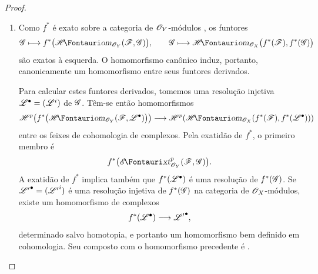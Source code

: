 \begin{proof}
\begin{enumerate}
  \item[\rm(i)]
  Como $f^*$ é exato sobre a categoria de $\mathscr{O}_Y$-módulos
  , os funtores
  \[
    \sh{G}\longmapsto
      f^*\bigl(\shHom_{\sh{O}_Y}(\sh{F},\sh{G})\bigr),
    \qquad
    \sh{G}\longmapsto
      \shHom_{\sh{O}_X}\bigl(f^*(\sh{F}),f^*(\sh{G})\bigr)
  \]
  são exatos à esquerda.  O homomorfismo canônico
   induz, portanto, canonicamente um
  homomorfismo entre seus funtores derivados.

  Para calcular estes funtores derivados, tomemos uma resolução injetiva
  $\mathscr{L}^\bullet=(\mathscr{L}^i)$ de $\mathscr{G}$.  Têm-se então
  homomorfismos
  \[
    \begin{aligned}
    \sh{H}^p\!\left(
      f^*\bigl(\shHom_{\sh{O}_Y}
        (\sh{F},\sh{L}^\bullet)\bigr)\right)
    \longrightarrow
    \sh{H}^p\!\left(
      \shHom_{\sh{O}_X}
        (f^*(\sh{F}),f^*(\sh{L}^\bullet))\right)
    \end{aligned}
  \]
  entre os feixes de cohomologia de complexos.
  Pela exatidão de $f^*$, o primeiro membro é
  \[
    f^*\bigl(\shExt^p_{\sh{O}_Y}(\sh{F},\sh{G})\bigr).
  \]
  A exatidão de $f^*$ implica também que
  $f^*(\mathscr{L}^\bullet)$ é uma resolução de $f^*(\mathscr{G})$.
  Se ${\mathscr{L}'}^\bullet=({\mathscr{L}'}^i)$ é uma resolução injetiva
  de $f^*(\mathscr{G})$ na categoria de $\mathscr{O}_X$-módulos, existe um
  homomorfismo de complexos
  \[
    f^*(\mathscr{L}^\bullet)\longrightarrow{\mathscr{L}'}^\bullet,
  \]
  determinado salvo homotopia, e portanto um homomorfismo bem definido em
  cohomologia.  Seu composto com o homomorfismo precedente é
  .


\end{enumerate}
\end{proof}
